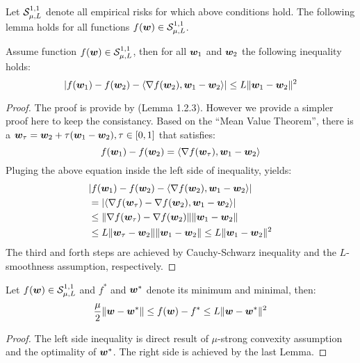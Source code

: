 \documentclass{article}
\begin{document}
Let ${\cal S}_{\mu,L}^{1,1}$ denote all empirical risks
 for which above conditions hold. The following lemma holds for
all functions $f(\bm{w}) \in {\cal S}_{\mu,L}^{1,1}$. 
\begin{lemma}
	Assume function $f(\bm{w}) \in {\cal S}_{\mu,L}^{1,1}$, then for all $\bm{w}_1$ and $\bm{w}_2$ the
	following inequality holds: 
    \begin{equation*}
    	| f(\bm{w}_1) - f(\bm{w}_2) - \langle \nabla f(\bm{w}_2), \bm{w}_1 - \bm{w}_2 \rangle | \leq
    	L \| \bm{w}_1 - \bm{w}_2 \| ^2 
    \end{equation*}
\end{lemma}
\begin{proof}
	The proof is provide by \cite{nesterov2004introductory} (Lemma 1.2.3). However
	we provide a simpler proof here to keep the consistancy. Based on the ``Mean
	Value Theorem'', there is a $\bm{w}_{\tau} = \bm{w}_2 + \tau(\bm{w}_1-\bm{w}_2), \tau \in [0,1]$
	that satisfies:
	\begin{equation*}
		f(\bm{w}_1) - f(\bm{w}_2) = \langle \nabla f(\bm{w}_{\tau}), \bm{w}_1 - \bm{w}_2 \rangle
	\end{equation*}
	Pluging the above equation inside the left side of inequality, yields: 
	\begin{eqnarray*}
		& | f(\bm{w}_1) - f(\bm{w}_2) - \langle \nabla f(\bm{w}_2), \bm{w}_1 - \bm{w}_2 \rangle | \\ 
		& = | \langle \nabla f(\bm{w}_{\tau}) - \nabla f(\bm{w}_2), \bm{w}_1 - \bm{w}_2 \rangle| \\ 
		& \leq \|  \nabla f(\bm{w}_{\tau}) - \nabla f(\bm{w}_2) \| \|\bm{w}_1 - \bm{w}_2 \|
		\\
		& \leq L \|  \bm{w}_{\tau} - \bm{w}_2 \| \|\bm{w}_1 - \bm{w}_2 \| \leq L \|\bm{w}_1 -
		\bm{w}_2 \|^2 \\
	\end{eqnarray*}
	The third and forth steps are achieved by Cauchy-Schwarz inequality and the
	$L$-smoothness assumption, respectively. 
\end{proof}
\begin{corollary} \label{corollary:smoothstrongbound}
	Let $f(\bm{w}) \in {\cal S}_{\mu,L}^{1,1}$ and $f^*$ and $\bm{w}^*$ denote its minimum and
	minimal, then: 
	\begin{equation*}
		\frac{\mu}{2} \| \bm{w} - \bm{w}^*  \| \leq f(\bm{w}) - f^* \leq L \| \bm{w} - \bm{w}^* \|^2
	\end{equation*}
\end{corollary}
\begin{proof}
	The left side inequality is direct result of $\mu$-strong convexity
	assumption and the optimality of $\bm{w}^*$. The right side is achieved by
	the last Lemma.
\end{proof}
\end{document}
